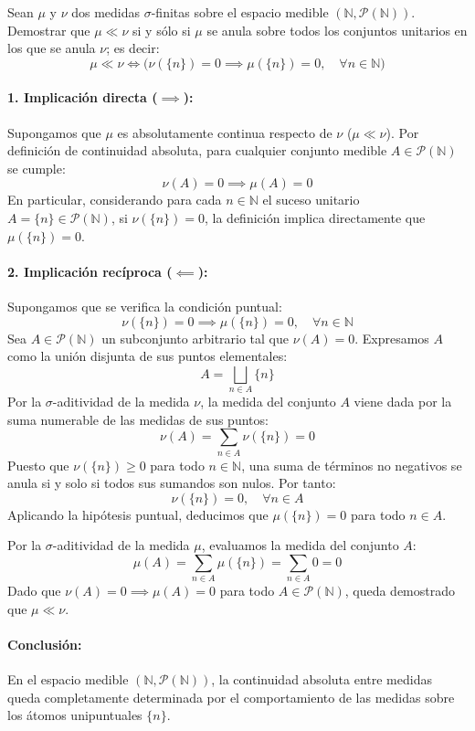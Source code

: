 \newpage
\begin{problema}
Sean $\mu$ y $\nu$ dos medidas $\sigma$-finitas sobre el espacio medible $(\mathbb{N}, \mathcal{P}(\mathbb{N}))$. Demostrar que $\mu \ll \nu$ si y sólo si $\mu$ se anula sobre todos los conjuntos unitarios en los que se anula $\nu$; es decir:
\[
    \mu \ll \nu \iff \bigl( \nu(\{n\}) = 0 \implies \mu(\{n\}) = 0, \quad \forall n \in \mathbb{N} \bigr)
\]

\tcblower

\paragraph{1. Implicación directa ($\implies$):}
Supongamos que $\mu$ es absolutamente continua respecto de $\nu$ ($\mu \ll \nu$). Por definición de continuidad absoluta, para cualquier conjunto medible $A \in \mathcal{P}(\mathbb{N})$ se cumple:
\[
    \nu(A) = 0 \implies \mu(A) = 0
\]
En particular, considerando para cada $n \in \mathbb{N}$ el suceso unitario $A = \{n\} \in \mathcal{P}(\mathbb{N})$, si $\nu(\{n\}) = 0$, la definición implica directamente que $\mu(\{n\}) = 0$.

\paragraph{2. Implicación recíproca ($\impliedby$):}
Supongamos que se verifica la condición puntual:
\[
    \nu(\{n\}) = 0 \implies \mu(\{n\}) = 0, \quad \forall n \in \mathbb{N}
\]
Sea $A \in \mathcal{P}(\mathbb{N})$ un subconjunto arbitrario tal que $\nu(A) = 0$. Expresamos $A$ como la unión disjunta de sus puntos elementales:
\[
    A = \bigsqcup_{n \in A} \{n\}
\]
Por la $\sigma$-aditividad de la medida $\nu$, la medida del conjunto $A$ viene dada por la suma numerable de las medidas de sus puntos:
\[
    \nu(A) = \sum_{n \in A} \nu(\{n\}) = 0
\]
Puesto que $\nu(\{n\}) \ge 0$ para todo $n \in \mathbb{N}$, una suma de términos no negativos se anula si y solo si todos sus sumandos son nulos. Por tanto:
\[
    \nu(\{n\}) = 0, \quad \forall n \in A
\]
Aplicando la hipótesis puntual, deducimos que $\mu(\{n\}) = 0$ para todo $n \in A$.

Por la $\sigma$-aditividad de la medida $\mu$, evaluamos la medida del conjunto $A$:
\[
    \mu(A) = \sum_{n \in A} \mu(\{n\}) = \sum_{n \in A} 0 = 0
\]
Dado que $\nu(A) = 0 \implies \mu(A) = 0$ para todo $A \in \mathcal{P}(\mathbb{N})$, queda demostrado que $\mu \ll \nu$.

\paragraph{Conclusión:}
En el espacio medible $(\mathbb{N}, \mathcal{P}(\mathbb{N}))$, la continuidad absoluta entre medidas queda completamente determinada por el comportamiento de las medidas sobre los átomos unipuntuales $\{n\}$.
\end{problema}

